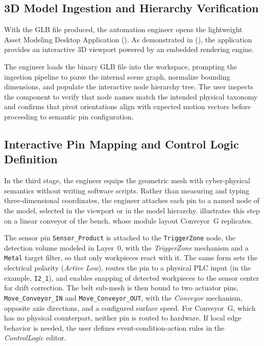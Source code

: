 \subsection{3D Model Ingestion and Hierarchy Verification}
With the \gls{GLB} file produced, the automation engineer opens the lightweight Asset Modeling Desktop Application (). As demonstrated in  (), the application provides an interactive 3D viewport powered by an embedded rendering engine. 

The engineer loads the binary \gls{GLB} file into the workspace, prompting the ingestion pipeline to parse the internal scene graph, normalize bounding dimensions, and populate the interactive node hierarchy tree. The user inspects the component to verify that node names match the intended physical taxonomy and confirms that pivot orientations align with expected motion vectors before proceeding to semantic pin configuration.

\subsection{Interactive Pin Mapping and Control Logic Definition}
In the third stage, the engineer equips the geometric mesh with cyber-physical semantics without writing software scripts. Rather than measuring and typing three-dimensional coordinates, the engineer attaches each pin to a named node of the model, selected in the viewport or in the model hierarchy.  illustrates this step on a linear conveyor of the bench, whose module layout Conveyor~G replicates.

The sensor pin \texttt{Sensor\_Product} is attached to the \texttt{TriggerZone} node, the detection volume modeled in Layer~0, with the \textit{TriggerZone} mechanism and a \texttt{Metal} target filter, so that only workpieces react with it. The same form sets the electrical polarity (\textit{Active Low}), routes the pin to a physical \gls{PLC} input (in the example, \texttt{I2\_1}), and enables snapping of detected workpieces to the sensor center for drift correction. The belt sub-mesh is then bound to two actuator pins, \texttt{Move\_Conveyor\_IN} and \texttt{Move\_Conveyor\_OUT}, with the \textit{Conveyor} mechanism, opposite axis directions, and a configured surface speed. For Conveyor~G, which has no physical counterpart, neither pin is routed to hardware. If local edge behavior is needed, the user defines event-condition-action rules in the \textit{ControlLogic} editor.

